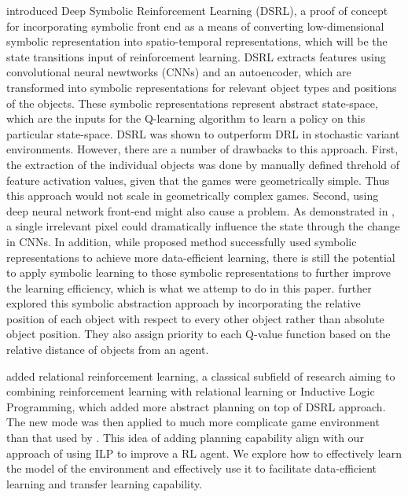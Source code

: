  \cite{Garnelo2016} introduced Deep Symbolic Reinforcement Learning (DSRL), a proof of concept for incorporating symbolic front end as a means of converting low-dimensional symbolic representation into spatio-temporal representations, which will be the state transitions input of reinforcement learning. 
 DSRL extracts features using convolutional neural newtworks (CNNs) \cite{LeCunL1998} and an autoencoder, which are transformed into symbolic representations for relevant object types and positions of the objects. 
 These symbolic representations represent abstract state-space, which are the inputs for the Q-learning algorithm to learn a policy on this particular state-space. 
 DSRL was shown to outperform DRL in stochastic variant environments.
However, there are a number of drawbacks to this approach. 
First, the extraction of the individual objects was done by manually defined threhold of feature activation values, given that the games were geometrically simple. 
Thus this approach would not scale in geometrically complex games. 
Second, using deep neural network front-end might also cause a problem. As demonstrated in \cite{Su2017}, a single irrelevant pixel could dramatically influence the state through the change in CNNs.
In addition, while proposed method successfully used symbolic representations to achieve more data-efficient learning, 
there is still the potential to apply symbolic learning to those symbolic representations to further improve the learning efficiency, which is what we attemp to do in this paper.
\cite{Garcez2018} further explored this symbolic abstraction approach by incorporating the relative position of each object with respect to every other object rather than absolute object position. 
They also assign priority to each Q-value function based on the relative distance of objects from an agent.

\cite{Zambaldi2018} added relational reinforcement learning, a classical subfield of research aiming to combining reinforcement learning with relational learning or Inductive Logic Programming,  which added more abstract planning on top of DSRL approach. 
The new mode was then applied to much more complicate game environment than that used by \cite{Garnelo2016}.
This idea of adding planning capability align with our approach of using ILP to improve a RL agent. 
We explore how to effectively learn the model of the environment and effectively use it to facilitate data-efficient learning and transfer learning capability.

